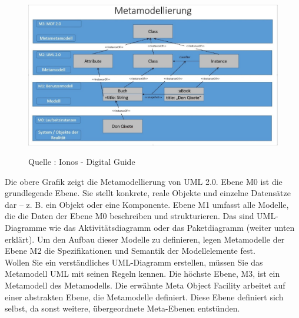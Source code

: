 \begin{center}
\begin{figure}[h]
   
\includegraphics[scale=1]{Graphics/metamodell.jpg} 



Quelle : Ionos - Digital Guide

\label{fig1}


\end{figure}
\end{center}
\newpage

Die obere Grafik zeigt die Metamodellierung von UML 2.0. Ebene M0 ist die grundlegende Ebene. Sie stellt konkrete, reale Objekte und einzelne Datensätze dar – z. B. ein Objekt oder eine Komponente. Ebene M1 umfasst alle Modelle, die die Daten der Ebene M0 beschreiben und strukturieren. Das sind UML-Diagramme wie das Aktivitätsdiagramm oder das Paketdiagramm (weiter unten erklärt). Um den Aufbau dieser Modelle zu definieren, legen Metamodelle der Ebene M2 die Spezifikationen und Semantik der Modellelemente fest.\\

Wollen Sie ein verständliches UML-Diagramm erstellen, müssen Sie das Metamodell UML mit seinen Regeln kennen. Die höchste Ebene, M3, ist ein Metamodell des Metamodells. Die erwähnte Meta Object Facility arbeitet auf einer abstrakten Ebene, die Metamodelle definiert. Diese Ebene definiert sich selbst, da sonst weitere, übergeordnete Meta-Ebenen entstünden.\\

